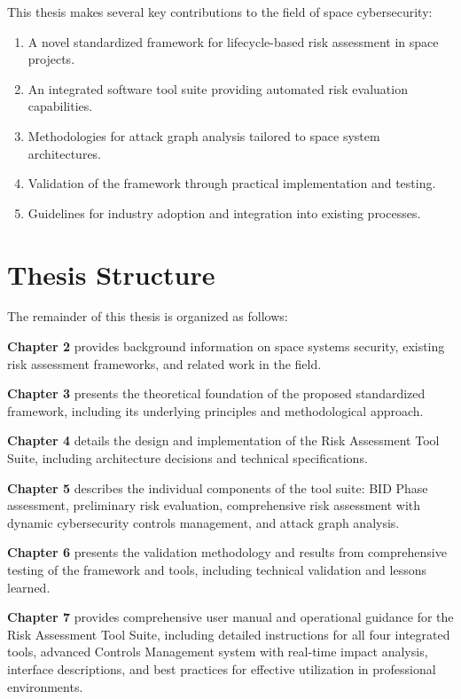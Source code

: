 \documentclass[binding=0.6cm]{sapthesis}
\begin{document}
This thesis makes several key contributions to the field of space cybersecurity:

\begin{enumerate}
    \item A novel standardized framework for lifecycle-based risk assessment in space projects.
    \item An integrated software tool suite providing automated risk evaluation capabilities.
    \item Methodologies for attack graph analysis tailored to space system architectures.
    \item Validation of the framework through practical implementation and testing.
    \item Guidelines for industry adoption and integration into existing processes.
\end{enumerate}

\section{Thesis Structure}

The remainder of this thesis is organized as follows:

\textbf{Chapter 2} provides background information on space systems security, existing risk assessment frameworks, and related work in the field.

\textbf{Chapter 3} presents the theoretical foundation of the proposed standardized framework, including its underlying principles and methodological approach.

\textbf{Chapter 4} details the design and implementation of the Risk Assessment Tool Suite, including architecture decisions and technical specifications.

\textbf{Chapter 5} describes the individual components of the tool suite: BID Phase assessment, preliminary risk evaluation, comprehensive risk assessment with dynamic cybersecurity controls management, and attack graph analysis.

\textbf{Chapter 6} presents the validation methodology and results from comprehensive testing of the framework and tools, including technical validation and lessons learned.

\textbf{Chapter 7} provides comprehensive user manual and operational guidance for the Risk Assessment Tool Suite, including detailed instructions for all four integrated tools, advanced Controls Management system with real-time impact analysis, interface descriptions, and best practices for effective utilization in professional environments.
\end{document}
